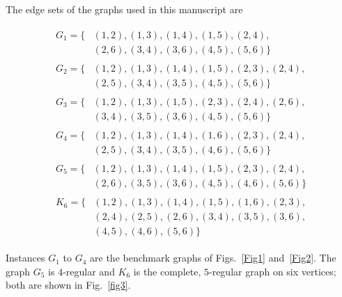 The edge sets of the graphs used in this manuscript are

\begin{align}
\begin{split}
    G_1 = \{ & (1,2), (1,3), (1,4), (1,5), (2,4), \\
             & (2,6), (3,4), (3,6), (4,5), (5,6) \}
\end{split} \\[0.5em]
\begin{split}
    G_2 = \{ & (1,2), (1,3), (1,4), (1,5), (2,3), (2,4), \\
             & (2,5), (3,4), (3,5), (4,5), (5,6) \}
\end{split} \\[0.5em]
\begin{split}
    G_3 = \{ & (1,2), (1,3), (1,5), (2,3), (2,4), (2,6), \\
             & (3,4), (3,5), (3,6), (4,5), (5,6) \}
\end{split} \\[0.5em]
\begin{split}
    G_4 = \{ & (1,2), (1,3), (1,4), (1,6), (2,3), (2,4), \\
             & (2,5), (3,4), (3,5), (4,6), (5,6) \}
\end{split} \\[0.5em]
\begin{split}
    G_5 = \{ & (1,2), (1,3), (1,4), (1,5), (2,3), (2,4), \\
             & (2,6), (3,5), (3,6), (4,5), (4,6), (5,6) \}
\end{split} \\[0.5em]
\begin{split}
    K_6 = \{ & (1,2), (1,3), (1,4), (1,5), (1,6), (2,3), \\
             & (2,4), (2,5), (2,6), (3,4), (3,5), (3,6), \\
             & (4,5), (4,6), (5,6) \}
\end{split}
\end{align}

Instances $G_1$ to $G_4$ are the benchmark graphs of Figs.~\ref{Fig1} and~\ref{Fig2}. The graph $G_5$ is $4$-regular and $K_6$ is the complete, $5$-regular graph on six vertices; both are shown in Fig.~\ref{fig3}.
